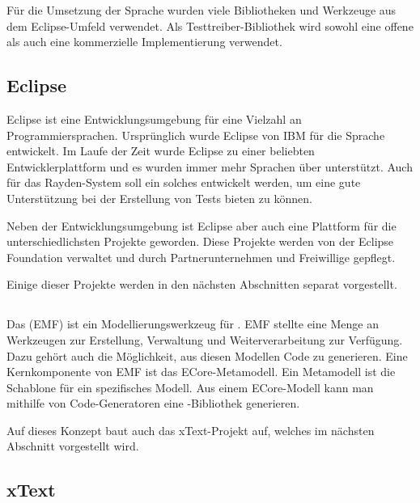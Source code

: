\SuperPar
Für die Umsetzung der Sprache wurden viele Bibliotheken und Werkzeuge aus dem Eclipse-Umfeld verwendet. Als Testtreiber-Bibliothek wird sowohl eine offene als auch eine kommerzielle Implementierung verwendet.

\subsection{Eclipse}

Eclipse \cite{Eclipse} ist eine Entwicklungsumgebung für eine Vielzahl an Programmiersprachen. Ursprünglich wurde Eclipse von IBM für die Sprache  entwickelt. Im Laufe der Zeit wurde Eclipse zu einer beliebten Entwicklerplattform und es wurden immer mehr Sprachen über  unterstützt. Auch für das Rayden-System soll ein solches  entwickelt werden, um eine gute Unterstützung bei der Erstellung von Tests bieten zu können. 

\SuperPar
Neben der Entwicklungsumgebung ist Eclipse aber auch eine Plattform für die unterschiedlichsten Projekte geworden. Diese Projekte werden von der Eclipse Foundation \cite{EclipseFoundation} verwaltet und durch Partnerunternehmen und Freiwillige gepflegt. 

\SuperPar
Einige dieser Projekte werden in den nächsten Abschnitten separat vorgestellt.

\subsection{}

Das  (EMF) \cite{EMF} ist ein Modellierungswerkzeug für . EMF stellte eine Menge an Werkzeugen zur Erstellung, Verwaltung und Weiterverarbeitung zur Verfügung. Dazu gehört auch die Möglichkeit, aus diesen Modellen Code zu generieren. Eine Kernkomponente von EMF ist das ECore-Metamodell. Ein Metamodell ist die Schablone für ein spezifisches Modell. Aus einem ECore-Modell kann man mithilfe von Code-Generatoren eine -Bibliothek generieren.

\SuperPar
Auf dieses Konzept baut auch das xText-Projekt auf, welches im nächsten Abschnitt vorgestellt wird. 

\subsection{xText}

